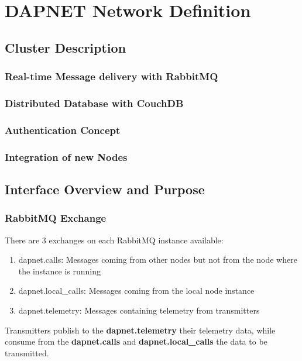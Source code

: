 \chapter{DAPNET Network Definition}


\section{Cluster Description}

\subsection{Real-time Message delivery with RabbitMQ}
\label{dapnetdef:clusterdesc:rabbitmq}

\subsection{Distributed Database with CouchDB}
\label{dapnetdef:clusterdesc:couchdb}

\subsection{Authentication Concept}

\subsection{Integration of new Nodes}


\section{Interface Overview and Purpose}

\subsection{RabbitMQ Exchange}
There are 3 exchanges on each RabbitMQ instance available:
\begin{enumerate}
\item dapnet.calls: Messages coming from other nodes but not from the node where the instance is running
\item dapnet.local\_calls: Messages coming from the local node instance
\item dapnet.telemetry: Messages containing telemetry from transmitters
\end{enumerate}

Transmitters publish to the \textbf{dapnet.telemetry} their telemetry data, while consume from the \textbf{dapnet.calls} and \textbf{dapnet.local\_calls} the data to be transmitted.

